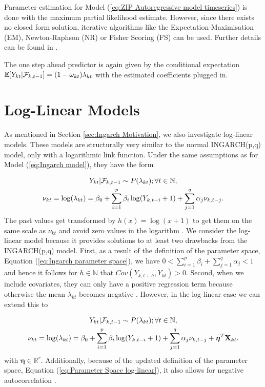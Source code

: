 Parameter estimation for Model (\ref{eq:ZIP Autoregressive model timeseries}) is done with the maximum partial likelihood estimate. However, since there exists no closed form solution, iterative algorithms like the Expectation-Maximisation (EM), Newton-Raphson (NR) or Fisher Scoring (FS) can be used.  Further details can be found in \textcite{Yang:2012}.

The one step ahead predictor is again given by the conditional expectation $\mathbb{E}[Y_{kt} | \mathcal{F}_{k,t-1}] = (1-\omega_{kt})\lambda_{kt} $ with the estimated coefficients plugged in. 

\section{Log-Linear Models}
\label{sec: Log-Linear Models}

As mentioned in Section \ref{sec:Ingarch Motivation}, we also investigate log-linear models. These models are structurally very similar to the normal INGARCH(p,q) model, only with a logarithmic link function. Under the same assumptions as for Model (\ref{eq:Ingarch model}), they have the form 

\begin{equation}
\begin{gathered}
Y_{kt} | \mathcal{F}_{k,t-1} \sim P(\lambda_{kt}); \forall t \in \mathbb{N}, \\
\nu_{kt}= \log(\lambda_{kt}) = \beta_0 + \sum_{i=1}^p\beta_i \log(Y_{k,t-i}+1) + \sum_{j=1}^q\alpha_j \nu_{k,t-j}.
\label{eq:Log-Linear model}
\end{gathered}
\end{equation}
%
The past values get transformed by $h(x)=\log(x+1)$ to get them on the same scale as $\nu_{kt}$ and avoid zero values in the logarithm \textcite{Liboschik:2016,Fokianos:2011}. We consider the log-linear model because it provides solutions to at least two drawbacks from the INGARCH(p,q) model. First, as a result of the definition of the parameter space, Equation (\ref{eq:Ingarch parameter space}), we have $0 < \sum_{i=1}^p\beta_i + \sum_{j=1}^q\alpha_j < 1$ and hence it follows for $h\in \mathbb{N}$ that $Cov(Y_{k,t+h},Y_{kt})>0$. Second, when we include covariates, they can only have a positive regression term because otherwise the mean $\lambda_{kt}$ becomes negative \textcite{Fokianos:2011}. However, in the log-linear case we can extend this to

\begin{equation}
\begin{gathered}
Y_{kt} | \mathcal{F}_{k,t-1} \sim P(\lambda_{kt}); \forall t \in \mathbb{N}, \\
\nu_{kt}= \log(\lambda_{kt}) = \beta_0 + \sum_{i=1}^p\beta_i \log(Y_{k,t-i}+1) + \sum_{j=1}^q\alpha_j \nu_{k,t-j} + \bm{\eta}^T\textbf{X}_{kt}.
\label{eq:Log-Linear model external factors}
\end{gathered}
\end{equation}
%
with $\bm{\eta} \in \mathbb{R}^r$. Additionally, because of the updated definition of the parameter space, Equation (\ref{eq:Parameter Space log-linear}), it also allows for negative autocorrelation \textcite{Liboschik:2016}. 

